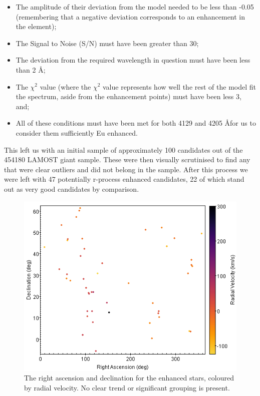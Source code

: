 \documentclass[a4paper,fleqn,usenatbib]{mnras}
\begin{document}
	\begin{itemize}
		\item The amplitude of their deviation from the model needed to be less than -0.05 (remembering that a negative deviation corresponds to an enhancement in the element);
		\item The Signal to Noise (S/N) must have been greater than 30;
		\item The deviation from the required wavelength in question must have been less than 2 \AA;
		\item The $\chi^{2}$ value (where the $\chi^{2}$ value represents how well the rest of the model fit the spectrum, aside from the enhancement points) must have been less 3, and;
		\item All of these conditions must have been met for both 4129 and 4205 \AA for us to consider them sufficiently Eu enhanced.
	\end{itemize}   
	
	This left us with an initial sample of approximately 100 candidates out of the 454180 LAMOST giant sample. These were then visually scrutinised to find any that were clear outliers and did not belong in the sample. After this process we were left with 47 potentially r-process enhanced candidates, 22 of which stand out as very good candidates by comparison.
	
	\begin{figure}
		\includegraphics[width=\columnwidth]{RA_DEC_RadVel_48}
		\caption{The right ascension and declination for the enhanced stars, coloured by radial velocity. No clear trend or significant grouping is present.}
		\label{fig:radec_Eucands}
	\end{figure}
	
\end{document}
